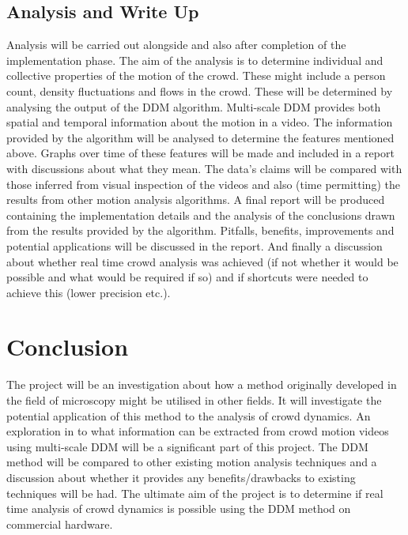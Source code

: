 \documentclass[11pt]{article}
\begin{document}
\subsection{Analysis and Write Up}
Analysis will be carried out alongside and also after completion of the implementation phase.
The aim of the analysis is to determine individual and collective properties of the motion of the crowd.
These might include a person count, density fluctuations and flows in the crowd.
These will be determined by analysing the output of the DDM algorithm.
Multi-scale DDM provides both spatial and temporal information about the motion in a video.
The information provided by the algorithm will be analysed to determine the features mentioned above.
Graphs over time of these features will be made and included in a report with discussions about what they mean.
The data's claims will be compared with those inferred from visual inspection of the videos and also (time permitting) the results from other motion analysis algorithms.
A final report will be produced containing the implementation details and the analysis of the conclusions drawn from the results provided by the algorithm.
Pitfalls, benefits, improvements and potential applications will be discussed in the report.
And finally a discussion about whether real time crowd analysis was achieved (if not whether it would be possible and what would be required if so) and if shortcuts were needed to achieve this (lower precision etc.).

\section{Conclusion}
The project will be an investigation about how a method originally developed in the field of microscopy might be utilised in other fields.
It will investigate the potential application of this method to the analysis of crowd dynamics.
An exploration in to what information can be extracted from crowd motion videos using multi-scale DDM will be a significant part of this project.
The DDM method will be compared to other existing motion analysis techniques and a discussion about whether it provides any benefits/drawbacks to existing techniques will be had.
The ultimate aim of the project is to determine if real time analysis of crowd dynamics is possible using the DDM method on commercial hardware.

\printbibliography
\end{document}
